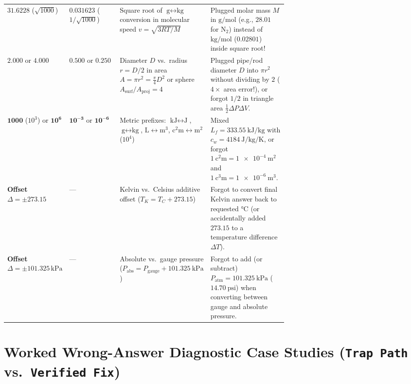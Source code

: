\begin{table}[h!]
\begin{tabularx}{\linewidth}{@{}R{0.18\linewidth} R{0.18\linewidth} >{\raggedright\arraybackslash}p{0.31\linewidth} >{\raggedright\arraybackslash}X@{}}
$\mathbf{31.6228}$ ($\sqrt{1000}$) & $\mathbf{0.031623}$ ($1/\sqrt{1000}$) & Square root of $\si{\gram} \leftrightarrow \si{\kilogram}$ conversion in molecular speed $v = \sqrt{3RT/M}$ & Plugged molar mass $M$ in $\si{\gram\per\mole}$ (e.g., $28.01$ for $\mathrm{N_2}$) instead of $\si{\kilogram\per\mole}$ ($0.02801$) inside square root! \\
$\mathbf{2.000}$ or $\mathbf{4.000}$ & $\mathbf{0.500}$ or $\mathbf{0.250}$ & Diameter $D$ vs.\ radius $r = D/2$ in area $A = \pi r^2 = \frac{\pi}{4}D^2$ or sphere $A_{\mathrm{surf}} / A_{\mathrm{proj}} = 4$ & Plugged pipe/rod diameter $D$ into $\pi r^2$ without dividing by $2$ ($4\times$ area error!), or forgot $1/2$ in triangle area $\frac{1}{2}\Delta P\Delta V$. \\
$\mathbf{1000}$ ($10^3$) or $\mathbf{10^6}$ & $\mathbf{10^{-3}}$ or $\mathbf{10^{-6}}$ & Metric prefixes: $\si{\kilo\joule}\leftrightarrow\si{\joule}$, $\si{\gram}\leftrightarrow\si{\kilogram}$, $\si{\liter}\leftrightarrow\si{\cubic\meter}$, $\si{\square\centi\meter}\leftrightarrow\si{\square\meter}$ ($10^4$) & Mixed $L_f = \SI{333.55}{\kilo\joule\per\kilogram}$ with $c_w = \SI{4184}{\joule\per\kilogram\per\kelvin}$, or forgot $\SI{1}{\square\centi\meter} = \SI{1e-4}{\square\meter}$ and $\SI{1}{\cubic\centi\meter} = \SI{1e-6}{\cubic\meter}$. \\
\textbf{Offset $\Delta = \pm 273.15$} & — & Kelvin vs.\ Celsius additive offset ($T_K = T_C + 273.15$) & Forgot to convert final Kelvin answer back to requested $\si{\celsius}$ (or accidentally added $273.15$ to a temperature difference $\Delta T$). \\
\textbf{Offset $\Delta = \pm 101.325\,\si{\kilo\pascal}$} & — & Absolute vs.\ gauge pressure ($P_{\mathrm{abs}} = P_{\mathrm{gauge}} + \SI{101.325}{\kilo\pascal}$) & Forgot to add (or subtract) $P_{\mathrm{atm}} = \SI{101.325}{\kilo\pascal}$ ($\SI{14.70}{\text{psi}}$) when converting between gauge and absolute pressure. \\
\bottomrule
\end{tabularx}
\end{table}

\section{Worked Wrong-Answer Diagnostic Case Studies (\texttt{Trap Path} vs.\ \texttt{Verified Fix})}\label{sec:20.5}

